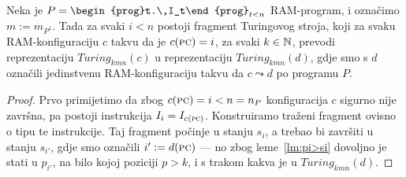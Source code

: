 \begin{propozicija}\label{prop:gadgets}
Neka je $P=\begin{prog}t.\,I_t\end{prog}_{t<n}$ RAM-program, i označimo $m:=m_{P^1}$. Tada za svaki $i<n$ postoji fragment Turingovog stroja, koji za svaku RAM-konfiguraciju $c$ takvu da je $c(\textsc{pc})=i$, za svaki $k\in{\mathbb N}$, prevodi reprezentaciju $Turing_{kmn}(c)$ u reprezentaciju $Turing_{kmn}(d)$, gdje smo s $d$ označili jedinstvenu RAM-konfiguraciju takvu da $c\leadsto d$ po programu $P$.
\end{propozicija}
\begin{proof}
Prvo primijetimo da zbog $c(\textsc{pc})=i<n=n_P$ konfiguracija $c$ sigurno nije završna, pa postoji instrukcija $I_i=I_{c(\textsc{pc})}$. Konstruiramo traženi fragment ovisno o tipu te instrukcije. Taj fragment počinje u stanju $s_i$, a trebao bi završiti u stanju $s_{i'}$, gdje smo označili $i':=d(\textsc{pc})$ --- no zbog leme~\ref{lm:pi>si} dovoljno je stati u $p_{i'}$, na bilo kojoj poziciji $p>k$, i s trakom kakva je u $Turing_{kmn}(d)$.


\end{proof}
